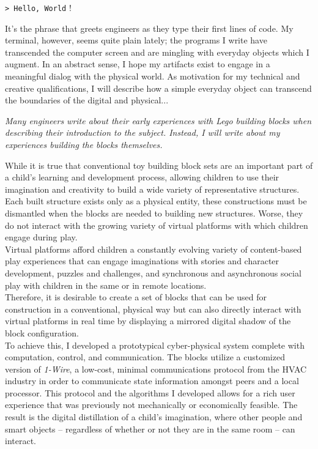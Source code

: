 \documentclass[]{article}
\title{}
\author{}
\begin{document}
\begin{addmargin}[0em]{2em}
\verb!> Hello, World! !
\vspace{2mm}
\end{addmargin}

It's the phrase that greets engineers as they type their first lines of code. My terminal, however, seems quite plain lately; the programs I write have transcended the computer screen and are mingling with everyday objects which I augment. In an abstract sense, I hope my artifacts exist to engage in a meaningful dialog with the physical world. As motivation for my technical and creative qualifications, I will describe how a simple everyday object can transcend the boundaries of the digital and physical...

\begin{addmargin}[1em]{2em}
	\vspace{2mm}
	\textit{Many engineers write about their early experiences with Lego building blocks when describing their introduction to the subject. Instead, I will write about my experiences building the blocks themselves.}
	\vspace{2mm}
\end{addmargin}

While it is true that conventional toy building block sets are an important part of a child's learning and development process, allowing children to use their imagination and creativity to build a wide variety of representative structures. Each built structure exists only as a physical entity, these constructions must be dismantled when the blocks are needed to building new structures. Worse, they do not interact with the growing variety of virtual platforms with which children engage during play.\\

Virtual platforms afford children a constantly evolving variety of content-based play experiences that can engage imaginations with stories and character development, puzzles and challenges, and synchronous and asynchronous social play with children in the same or in remote locations.\\

Therefore, it is desirable to create a set of blocks that can be used for construction in a conventional, physical way but can also directly interact with virtual platforms in real time by displaying a mirrored digital shadow of the block configuration.\\

To achieve this, I developed a prototypical cyber-physical system complete with computation, control, and communication.  The blocks utilize a customized version of \textit{1-Wire}, a low-cost, minimal communications protocol from the HVAC industry in order to communicate state information amongst peers and a local processor. This protocol and the algorithms I developed allows for a rich user experience that was previously not mechanically or economically feasible. The result is the digital distillation of a child's imagination, where other people and smart objects -- regardless of whether or not they are in the same room -- can interact.\\
\end{document}
